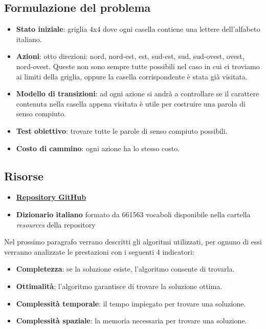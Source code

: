 \documentclass[10pt,a4paper]{article}
\begin{document}
	\subsection{Formulazione del problema}
	\begin{itemize}
		\item \textbf{Stato iniziale}: griglia 4x4 dove ogni casella contiene una lettere dell'alfabeto italiano.
		\item \textbf{Azioni}: otto direzioni: nord, nord-est, est, sud-est, sud, sud-ovest, ovest, nord-ovest. Queste non sono sempre tutte possibili nel caso in cui ci troviamo ai limiti della griglia, oppure la casella corrispondente è stata già visitata.
		\item \textbf{Modello di transizioni}: ad ogni azione si andrà a controllare se il carattere contenuta nella casella appena visitata è utile per costruire una parola di senso compiuto.
		\item \textbf{Test obiettivo}: trovare tutte le parole di senso compiuto possibili.
		\item\textbf{Costo di cammino}: ogni azione ha lo stesso costo.
	\end{itemize}
	\subsection{Risorse}
	\begin{itemize}
		\item \href{https://github.com/RazzoloDevs/Razzolo}{\textbf{Repository GitHub}}
		\item \textbf{Dizionario italiano} formato da 661563 vocaboli disponibile nella cartella \textit{resources} della repository
	\end{itemize}
	Nel prossimo paragrafo verrano descritti gli algoritmi utilizzati, per ognuno di essi verranno analizzate le prestazioni con i seguenti 4 indicatori:
	\begin{itemize}
		\item \textbf{Completezza}: se la soluzione esiste, l'algoritmo consente di trovarla.
		\item \textbf{Ottimalità}; l'algoritmo garantisce di trovare la soluzione ottima.
		\item \textbf{Complessità temporale}: il tempo impiegato per trovare una soluzione.
		\item \textbf{Complessità spaziale}: la memoria necessaria per trovare una soluzione.
	\end{itemize}
	\newpage
\end{document}
